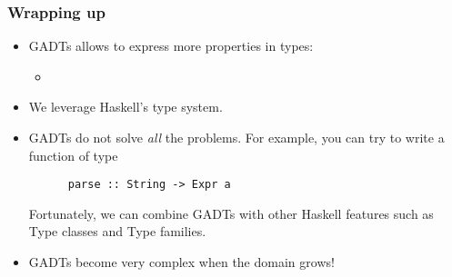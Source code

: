 \documentclass[pdftex,aspectratio=169]{beamer}
\begin{document}
\begin{frame}[fragile]
  \frametitle{Wrapping up}
  \begin{itemize}[<+->]
  \item GADTs allows to express more properties in types:
    \begin{itemize}
    \item 
    \end{itemize}
  \item We leverage Haskell's type system.
  \item GADTs do not solve \emph{all} the problems.
    For example, you can try to write a function of type
    \begin{lstlisting}
      parse :: String -> Expr a
    \end{lstlisting}
    \pause
    Fortunately, we can combine GADTs with other Haskell features such as Type classes and Type families.
  \item GADTs become very complex when the domain grows!
  \end{itemize}
\end{frame}
\end{document}
